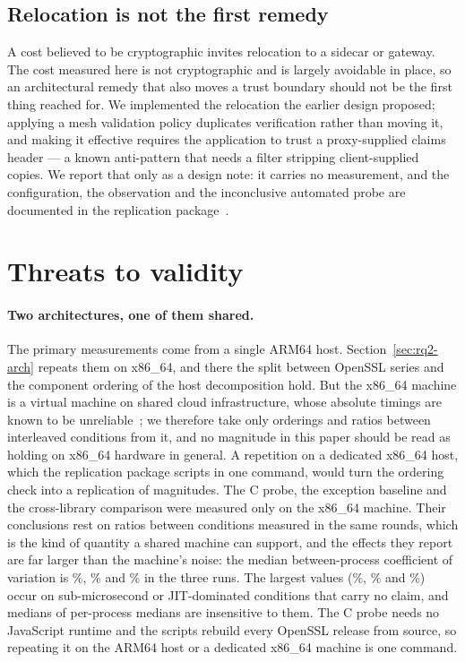 \documentclass[pdflatex,sn-basic,twocolumn]{sn-jnl}%
\begin{document}
\subsection{Relocation is not the first remedy}\label{sec:offload}

A cost believed to be cryptographic invites relocation to a sidecar or gateway.
The cost measured here is not cryptographic and is largely avoidable in place,
so an architectural remedy that also moves a trust boundary should not be the
first thing reached for. We implemented the relocation the earlier design
proposed; applying a mesh validation policy duplicates verification rather
than moving it, and making it effective requires the application to trust a
proxy-supplied claims header --- a known anti-pattern that needs a filter
stripping client-supplied copies. We report that only as a design note: it
carries no measurement, and the configuration, the observation and the
inconclusive automated probe are documented in the replication
package~\citep{artifact2026}.

\section{Threats to validity}\label{sec:threats}

\paragraph{Two architectures, one of them shared.} The primary measurements
come from a single ARM64 host. Section~\ref{sec:rq2-arch} repeats them on
x86\_64, and there the split between OpenSSL series and the component
ordering of the host decomposition hold. But the x86\_64 machine is a virtual machine on shared
cloud infrastructure, whose absolute timings are known to be
unreliable~\citep{laaber2019cloud}; we therefore take only orderings and ratios
between interleaved conditions from it, and no magnitude in this paper should
be read as holding on x86\_64 hardware in general. A repetition on a dedicated
x86\_64 host, which the replication package scripts in one command, would turn
the ordering check into a replication of magnitudes. The C probe, the exception
baseline and the cross-library comparison were measured only on the x86\_64
machine. Their conclusions rest on ratios between conditions measured in the
same rounds, which is the kind of quantity a shared machine can support, and
the effects they report are far larger than the machine's noise: the median
between-process coefficient of variation is \CProbeCvMedian\%,
\ExcCvMedian\% and \XlibCvMedian\% in the three runs. The largest values
(\CProbeCvMax\%, \ExcCvMax\% and \XlibCvMax\%) occur on sub-microsecond or
JIT-dominated conditions that carry no claim, and medians of per-process
medians are insensitive to them. The C probe needs no JavaScript runtime and
the scripts rebuild every OpenSSL release from source, so repeating it on the
ARM64 host or a dedicated x86\_64 machine is one command.
\end{document}
